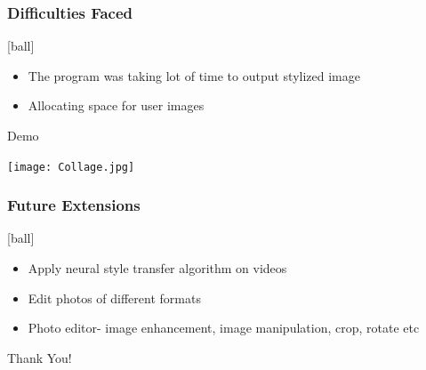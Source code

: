 \documentclass[14pt]{beamer}
\begin{document}
\begin{frame}
		\frametitle{Difficulties Faced}
        \begin{itemize}

				\item The program was taking lot of time to output stylized image
                \item Allocating space for user images
		\end{itemize}
\end{frame}

\begin{frame}
    \begin{center}
        \Huge Demo
    \end{center}
\end{frame}

\begin{frame}
     \begin{center}
         \texttt{[image: Collage.jpg]}
     \end{center}
\end{frame}

\begin{frame}
    \frametitle{Future Extensions}
    [ball]
    \begin{itemize}
    \item Apply neural style transfer algorithm on videos
    \item Edit photos of different formats
    \item Photo editor- image enhancement, image manipulation, crop, rotate etc
    \end{itemize}
\end{frame}

\begin{frame}
    \begin{center}  
       \Huge Thank You!
    \end{center}
\end{frame}
\end{document}
